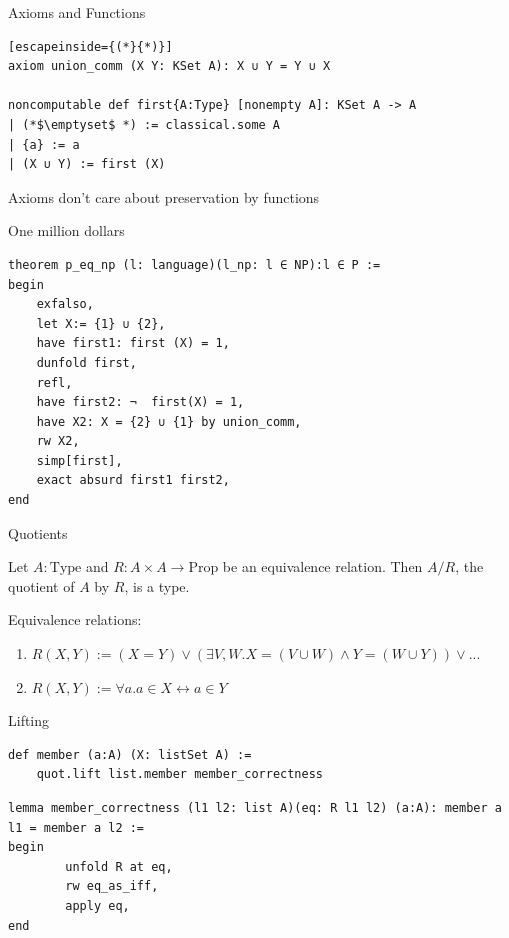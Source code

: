 \documentclass[aspectratio=169]{beamer}
\begin{document}
    \begin{frame}[fragile]{Axioms and Functions}
        \begin{lstlisting}[escapeinside={(*}{*)}]
axiom union_comm (X Y: KSet A): X ∪ Y = Y ∪ X

noncomputable def first{A:Type} [nonempty A]: KSet A -> A
| (*$\emptyset$ *) := classical.some A
| {a} := a
| (X ∪ Y) := first (X)
    \end{lstlisting}
        \begin{block}{}
            Axioms don't care about preservation by functions
        \end{block}
    \end{frame}
    \begin{frame}[fragile]{One million dollars}
        \begin{lstlisting}
theorem p_eq_np (l: language)(l_np: l ∈ NP):l ∈ P :=
begin
    exfalso,
    let X:= {1} ∪ {2},
    have first1: first (X) = 1,
    dunfold first,
    refl,
    have first2: ¬  first(X) = 1,
    have X2: X = {2} ∪ {1} by union_comm,
    rw X2,
    simp[first],
    exact absurd first1 first2,
end
            \end{lstlisting}
    \end{frame}
    \begin{frame}{Quotients}
        \begin{definition}
            Let $A: \text{{Type}}$ and $R: A \times A \to \text{{Prop}}$ be an equivalence relation.
            Then $A/R$, the quotient of $A$ by $R$, is a type.
        \end{definition}
    \pause
    Equivalence relations:
    \begin{enumerate}[<+->]
        \item $R(X,Y) := (X = Y) \lor (\exists V, W. X= (V \cup W) \land Y = (W \cup Y)) \lor ...$
        \item $R(X,Y) := \forall a. a \in X \leftrightarrow a \in Y$
    \end{enumerate}

    \end{frame}
    \begin{frame}[fragile]{Lifting}
    \begin{lstlisting}
def member (a:A) (X: listSet A) := 
    quot.lift list.member member_correctness
    \end{lstlisting}

    \begin{lstlisting}
lemma member_correctness (l1 l2: list A)(eq: R l1 l2) (a:A): member a l1 = member a l2 :=
begin
        unfold R at eq,
        rw eq_as_iff,
        apply eq,
end
    \end{lstlisting}
    \end{frame}
\end{document}
